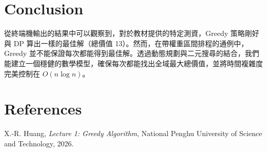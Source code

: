\documentclass[conference, a4paper]{IEEEtran}
\begin{document}
\section{Conclusion}
從終端機輸出的結果中可以觀察到，對於教材提供的特定測資，Greedy 策略剛好與 DP 算出一樣的最佳解（總價值 13）。然而，在帶權重區間排程的通例中，Greedy 並不能保證每次都能得到最佳解。透過動態規劃與二元搜尋的結合，我們能建立一個穩健的數學模型，確保每次都能找出全域最大總價值，並將時間複雜度完美控制在 $O(n \log n)$。

\section{References}
\noindent [1] X.-R. Huang, \textit{Lecture 1: Greedy Algorithm}, National Penghu University of Science and Technology, 2026.
\end{document}
